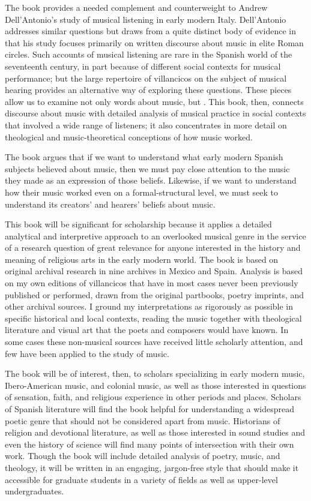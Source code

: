 \documentclass{vcbook-proposal}
\begin{document}
The book provides a needed complement and counterweight to Andrew
Dell'Antonio's study of musical listening in early modern Italy.%
    \Autocite{DellAntonio:Listening}
Dell'Antonio addresses similar questions but draws from a quite distinct body of
evidence in that his study focuses primarily on written discourse about music in
elite Roman circles.
Such accounts of musical listening are rare in the Spanish world of the
seventeenth century, in part because of different social contexts for musical
performance; but the large repertoire of villancicos on the subject of musical
hearing provides an alternative way of exploring these questions.
These pieces allow us to examine not only words about music, but .
This book, then, connects discourse about music with detailed analysis of musical
practice in social contexts that involved a wide range of listeners; it also 
concentrates in more detail on theological and music-theoretical conceptions
of how music worked.

The book argues that if we want to understand what early modern Spanish 
subjects believed about music, then we must pay close attention to the music 
they made as an expression of those beliefs.
Likewise, if we want to understand how their music worked even on a 
formal-structural level, we must seek to understand its creators' and hearers' 
beliefs about music.

This book will be significant for scholarship because it applies a detailed
analytical and interpretive approach to an overlooked musical genre in the
service of a research question of great relevance for anyone interested in the
history and meaning of religious arts in the early modern world.
The book is based on original archival research in nine archives in Mexico and 
Spain.
Analysis is based on my own editions of villancicos that have in most cases 
never been previously published or performed, drawn from the original partbooks, 
poetry imprints, and other archival sources.
I ground my interpretations as rigorously as possible in specific historical 
and local contexts, reading the music together with theological literature and 
visual art that the poets and composers would have known.
In some cases these non-musical sources have received little scholarly 
attention, and few have been applied to the study of music.

The book will be of interest, then, to scholars specializing in early
modern music, Ibero-American music, and colonial music, as well as those
interested in questions of sensation, faith, and religious experience in other
periods and places.
Scholars of Spanish literature will find the book helpful for understanding a
widespread poetic genre that should not be considered apart from music.
Historians of religion and devotional literature, as well as those interested
in sound studies and even the history of science will find many points of
intersection with their own work.
Though the book will include detailed analysis of poetry, music, and theology,
it will be written in an engaging, jargon-free style that should make it
accessible for graduate students in a variety of fields as well as upper-level
undergraduates. 
\end{document}
